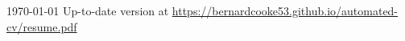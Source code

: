 \documentclass[11pt, a4paper]{awesome-cv}
\begin{document}
\makecvheader[C]

\makecvfooter
{\today}
{Up-to-date version at \upshape\color{text}\url{https://bernardcooke53.github.io/automated-cv/resume.pdf}}
{\thepage}



\medskip
\vspace{1em}

\vspace{-1em}


\medskip

\end{document}
